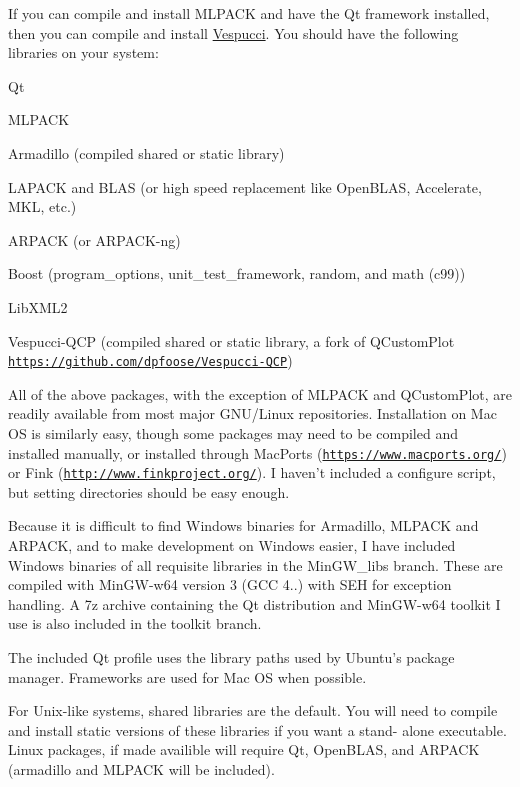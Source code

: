 If you can compile and install M\+L\+P\+A\+C\+K and have the Qt framework installed, then you can compile and install \hyperlink{namespace_vespucci}{Vespucci}. You should have the following libraries on your system\+:


\begin{DoxyItemize}
\item Qt
\item M\+L\+P\+A\+C\+K
\item Armadillo (compiled shared or static library)
\item L\+A\+P\+A\+C\+K and B\+L\+A\+S (or high speed replacement like Open\+B\+L\+A\+S, Accelerate, M\+K\+L, etc.)
\item A\+R\+P\+A\+C\+K (or A\+R\+P\+A\+C\+K-\/ng)
\item Boost (program\+\_\+options, unit\+\_\+test\+\_\+framework, random, and math (c99))
\item Lib\+X\+M\+L2
\item Vespucci-\/\+Q\+C\+P (compiled shared or static library, a fork of Q\+Custom\+Plot \href{https://github.com/dpfoose/Vespucci-QCP}{\tt https\+://github.\+com/dpfoose/\+Vespucci-\/\+Q\+C\+P})
\end{DoxyItemize}

All of the above packages, with the exception of M\+L\+P\+A\+C\+K and Q\+Custom\+Plot, are readily available from most major G\+N\+U/\+Linux repositories. Installation on Mac O\+S is similarly easy, though some packages may need to be compiled and installed manually, or installed through Mac\+Ports (\href{https://www.macports.org/}{\tt https\+://www.\+macports.\+org/}) or Fink (\href{http://www.finkproject.org/}{\tt http\+://www.\+finkproject.\+org/}). I haven't included a configure script, but setting directories should be easy enough.

Because it is difficult to find Windows binaries for Armadillo, M\+L\+P\+A\+C\+K and A\+R\+P\+A\+C\+K, and to make development on Windows easier, I have included Windows binaries of all requisite libraries in the Min\+G\+W\+\_\+libs branch. These are compiled with Min\+G\+W-\/w64 version 3 (G\+C\+C 4..) with S\+E\+H for exception handling. A 7z archive containing the Qt distribution and Min\+G\+W-\/w64 toolkit I use is also included in the toolkit branch.

The included Qt profile uses the library paths used by Ubuntu's package manager. Frameworks are used for Mac O\+S when possible.

For Unix-\/like systems, shared libraries are the default. You will need to compile and install static versions of these libraries if you want a stand-\/ alone executable. Linux packages, if made availible will require Qt, Open\+B\+L\+A\+S, and A\+R\+P\+A\+C\+K (armadillo and M\+L\+P\+A\+C\+K will be included). 